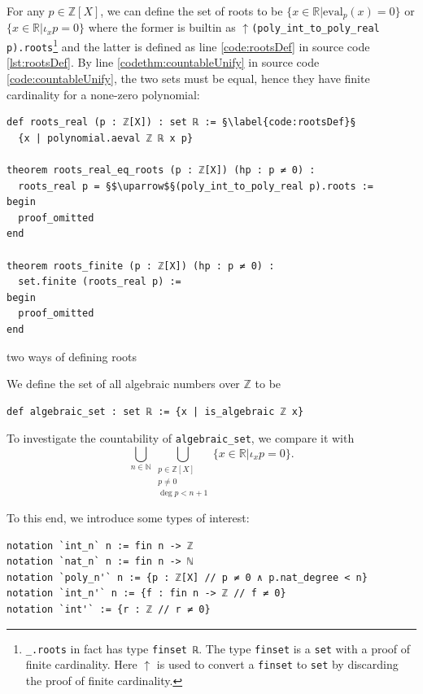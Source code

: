 \documentclass{report}
\theoremstyle{definition}
\newenvironment{code}{\captionsetup{type=listing}}{}
\begin{document}
For any $p\in\mathbb Z[X]$, we can define the set of roots to be $\{x \in\mathbb R | \mathrm{eval}_p(x) = 0\}$ or $\{x\in\mathbb R| \iota_x p=0\}$ where the former is builtin as {\tt \small $\uparrow$(poly\_int\_to\_poly\_real p).roots}\footnote{{\tt \footnotesize \_.roots} in fact has type {\tt \footnotesize finset ℝ}. The type {\tt \footnotesize finset} is a {\tt \footnotesize set} with a proof of finite cardinality. Here $\uparrow$ is used to convert a {\tt \footnotesize finset} to {\tt \footnotesize set} by discarding the proof of finite cardinality.} and the latter is defined as line \ref{code:rootsDef} in source code \ref{lst:rootsDef}. By line \ref{codethm:countableUnify} in source code \ref{code:countableUnify}, the two sets must be equal, hence they have finite cardinality for a none-zero polynomial:

\begin{code}
\begin{verbatim}
def roots_real (p : ℤ[X]) : set ℝ := §\label{code:rootsDef}§
  {x | polynomial.aeval ℤ ℝ x p}

theorem roots_real_eq_roots (p : ℤ[X]) (hp : p ≠ 0) : 
  roots_real p = §$\uparrow$§(poly_int_to_poly_real p).roots :=
begin
  proof_omitted
end

theorem roots_finite (p : ℤ[X]) (hp : p ≠ 0) : 
  set.finite (roots_real p) :=
begin
  proof_omitted
end
\end{verbatim}
\caption{two ways of defining roots}
\label{lst:rootsDef}
\end{code}

We define the set of all algebraic numbers over $\mathbb Z$ to be
\begin{verbatim}
def algebraic_set : set ℝ := {x | is_algebraic ℤ x}
\end{verbatim}
To investigate the countability of {\tt \small algebraic\_set}, we compare it with
\begin{equation}
  \bigcup_{n\in\mathbb N}\bigcup_{\substack{p\in\mathbb{Z}[X]\\ p\ne 0\\ \deg{p}<n+1}} \{x\in\mathbb{R}|\iota_xp=0\}.
  \label{countability:setEq}
\end{equation}


To this end, we introduce some types of interest:
\begin{verbatim}
notation `int_n` n := fin n -> ℤ
notation `nat_n` n := fin n -> ℕ
notation `poly_n'` n := {p : ℤ[X] // p ≠ 0 ∧ p.nat_degree < n}
notation `int_n'` n := {f : fin n -> ℤ // f ≠ 0}
notation `int'` := {r : ℤ // r ≠ 0}
\end{verbatim}
\end{document}
